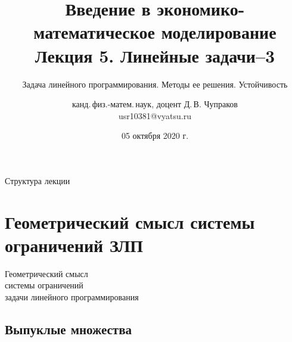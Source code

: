 \documentclass[unicode,11pt,notheorems]{beamer}
\author[Д.\,В. Чупраков]{канд.\,физ.-матем.\,наук, доцент Д.\,В. Чупраков\\[6pt] usr10381@vyatsu.ru}
\institute[ВятГУ]{ФГБОУ ВО Вятский государственный университет}
\title[Лекция~5. Линейные задачи. Часть~3 из 4]{
	Введение в экономико-математическое моделирование\\[12pt]
	Лекция 5. Линейные задачи--3}
\subtitle{Задача линейного программирования. Методы ее решения. Устойчивость}
\date{05 октября 2020 г.}
\begin{document}
\maketitle

\begin{frame}{Структура лекции}
	\tableofcontents
\end{frame}




\section{Геометрический смысл системы ограничений ЗЛП}

\begin{frame}[t]{}{}
\vspace{2cm}
{\LARGE Геометрический смысл\\ системы ограничений\\ задачи линейного программирования\par}
\vspace{\fill}

\end{frame}   

\subsection{Выпуклые множества}
\end{document}
